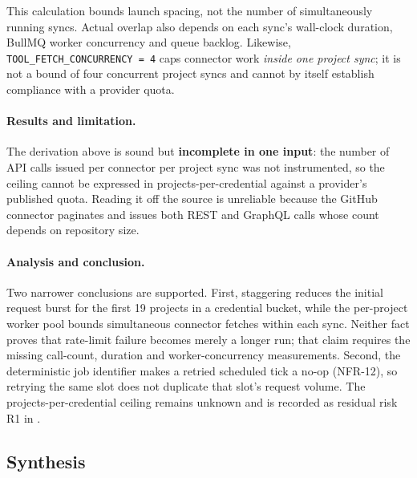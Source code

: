 This calculation bounds launch spacing, not the number of simultaneously running
syncs. Actual overlap also depends on each sync's wall-clock duration, BullMQ
worker concurrency and queue backlog. Likewise,
\texttt{TOOL\_FETCH\_CONCURRENCY = 4} caps connector work \emph{inside one
project sync}; it is not a bound of four concurrent project syncs and cannot by
itself establish compliance with a provider quota.

\paragraph{Results and limitation.} The derivation above is sound but
\textbf{incomplete in one input}: the number of API calls issued per connector
per project sync was not instrumented, so the ceiling cannot be expressed in
projects-per-credential against a provider's published quota. Reading it off the
source is unreliable because the GitHub connector paginates and issues both REST
and GraphQL calls whose count depends on repository size.

\paragraph{Analysis and conclusion.} Two narrower conclusions are supported.
First, staggering reduces the initial request burst for the first 19 projects in
a credential bucket, while the per-project worker pool bounds simultaneous
connector fetches within each sync. Neither fact proves that rate-limit failure
becomes merely a longer run; that claim requires the missing call-count,
duration and worker-concurrency measurements. Second, the deterministic job
identifier makes a retried scheduled tick a no-op (NFR-12), so retrying the same
slot does not duplicate that slot's request volume. The projects-per-credential
ceiling remains unknown and is recorded as residual risk R1 in
.

\subsection{Synthesis}
\label{subsec:synthesis}

